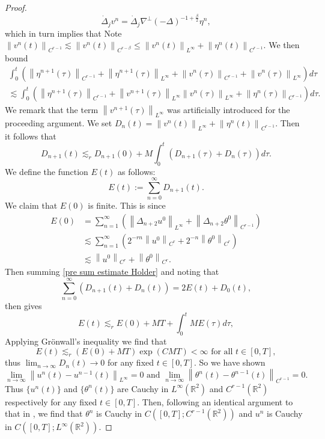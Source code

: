 \documentclass[12pt,xcolor=svgnames]{amsart}
\newcommand{\R}{\mathbb{R}}
\newcommand{\norm}[2]{\left\lVert#1\right\rVert_{#2}}
\newcommand{\eqdef}{:=}
\begin{document}
\begin{proof}
$$
\dot{\Delta}_j v^n = \dot{\Delta}_j \nabla^{\perp}(-\Delta)^{-1+\frac{\beta}{2}}\eta^{n},
$$
which in turn implies that 
Note $\norm{v^{n}(t)}{C^{r-1}}\lesssim\norm{v^n(t)}{C^{r-\beta}} \leq \norm{v^n(t)}{L^{\infty}}+ \norm{\eta^n(t)}{C^{r-1}}$. We then bound 
\begin{multline}
\int_0^t \left( \norm{\eta^{n+1}(\tau)}{C^{r-1}} + \norm{\eta^{n+1}(\tau)}{L^{\infty}} + \norm{v^{n}(\tau)}{C^{r-1}} + \norm{v^n(\tau)}{L^{\infty}} \right)d\tau \\
\lesssim 
\int_0^t \left( \norm{\eta^{n+1}(\tau)}{C^{r-1}} + \norm{v^{n+1}(\tau)}{L^{\infty}} \norm{v^n(\tau)}{L^{\infty}} + \norm{\eta^n(\tau)}{C^{r-1}}\right)d\tau.
\end{multline}
We remark that the term $\norm{v^{n+1}(\tau)}{L^{\infty}}$ was artificially introduced for the proceeding argument. We set $D_n(t) = \norm{v^n(t)}{L^{\infty}}+\norm{\eta^n(t)}{C^{r-1}}$. %
Then it follows that
\begin{equation}
\label{pre sum estimate Holder}
D_{n+1}(t) \lesssim_r D_{n+1}(0) + M\int_0^t (D_{n+1}(\tau)+D_n(\tau))d\tau.
\end{equation}
We define the function $E(t)$ as follows:
$$
E(t) \eqdef  \sum_{n=0}^{\infty} D_{n+1}(t).
$$
We claim that $E(0)$ is finite. This is since
\begin{align*}
E(0)&=\sum_{n=1}^{\infty}\left( \norm{\Delta_{n+2}u^0}{L^{\infty}} + \norm{\Delta_{n+2}\theta^0}{C^{r-1}}\right) \\
&\lesssim \sum_{n=1}^{\infty}\left(2^{-rn}\norm{u^0}{C^r} + 2^{-n}\norm{\theta^0}{C^r}\right)\\
&\lesssim \norm{u^0}{C^r}+\norm{\theta^0}{C^r}.
\end{align*}
Then summing \eqref{pre sum estimate Holder} and noting that
$$
\sum_{n=0}^{\infty} \left(D_{n+1}(t)+D_n(t)\right) = 2E(t) + D_0(t),
$$
then gives 
$$
E(t) \lesssim_r E(0)+MT + \int_0^t ME(\tau)d\tau,
$$
Applying Grönwall's inequality we find that %
$$
E(t) \lesssim_r (E(0)+MT)\exp(CMT) <\infty \text{ for all } t\in [0,T],
$$
thus $\lim_{n \to \infty} D_n(t) \to 0$ for any fixed $t \in [0,T]$. So we have shown  $$\lim_{n \to \infty} \norm{u^n(t)-u^{n-1}(t)}{L^{\infty}}=0 \text{ and } \lim_{n \to \infty}\norm{\theta^{n}(t)-\theta^{n-1}(t)}{C^{r-1}}=0.$$ 
Thus $\{u^n(t)\}$ and $\{\theta^n(t)\}$ are Cauchy in $L^{\infty}(\R^2)$ and $C^{r-1}(\R^2)$ respectively for any fixed $t \in [0,T]$. Then, following an identical argument to that in \cite{1}, we find that  $\theta^n$ is Cauchy in $C([0,T];C^{r-1}(\R^2))$ and $u^n$ is Cauchy in $C([0,T];L^{\infty}(\R^2))$.

\end{proof}
\end{document}
